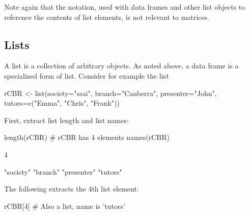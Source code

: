 Note again that the \txtt{\$} notation, used with data frames
  and other list objects to reference the contents of list elements, is
  not relevant to matrices.

\subsection{Lists}\label{sec:df-lists}

A list  is a collection of arbitrary
objects. As noted above, a data frame is a specialized form of
list. Consider for example the list
\begin{Schunk}
\begin{Sinput}
rCBR <- list(society="ssai", branch="Canberra",
             presenter="John",
             tutors=c("Emma", "Chris", "Frank"))
\end{Sinput}
\end{Schunk}

First, extract list length and list names:
\begin{Schunk}
\begin{Sinput}
length(rCBR)      # rCBR has 4 elements
names(rCBR)
\end{Sinput}
\end{Schunk}

\begin{Schunk}
\begin{Soutput}
[1] 4
\end{Soutput}
\begin{Soutput}
[1] "society"   "branch"    "presenter" "tutors"   
\end{Soutput}
\end{Schunk}

The following extracts the 4th list element:
\begin{Schunk}
\begin{Sinput}
rCBR[4]           # Also a list,  name is 'tutors'
\end{Sinput}
\end{Schunk}

